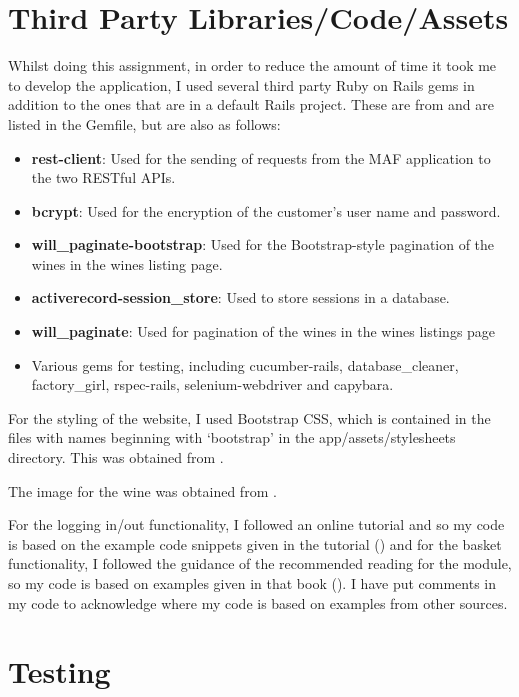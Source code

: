 \documentclass[a4paper,12pt,hidelinks]{report}
\begin{document}
\chapter{Third Party Libraries/Code/Assets}
    Whilst doing this assignment, in order to reduce the amount of time it took me to develop the application, I used several third party
    Ruby on Rails gems in addition to the ones that are in a default Rails project. These are from \cite{gems} and are listed in the Gemfile, 
    but are also as follows:
    \begin{itemize}
        \item \textbf{rest-client}: Used for the sending of requests from the MAF application to the two RESTful APIs.
        \item \textbf{bcrypt}: Used for the encryption of the customer's user name and password.
        \item \textbf{will\_paginate-bootstrap}: Used for the Bootstrap-style pagination of the wines in the wines listing page.
        \item \textbf{activerecord-session\_store}: Used to store sessions in a database.
        \item \textbf{will\_paginate}: Used for pagination of the wines in the wines listings page
        \item Various gems for testing, including cucumber-rails, database\_cleaner, factory\_girl, rspec-rails, selenium-webdriver and capybara.
    \end{itemize}

    For the styling of the website, I used Bootstrap CSS, which is contained in the files with names beginning with `bootstrap' in the app/assets/stylesheets
    directory. This was obtained from \cite{bootstrap}.

    The image for the wine was obtained from \cite{wine-image}.

    For the logging in/out functionality, I followed an online tutorial and so my code is based on the example code snippets given in the tutorial (\cite{online-ruby-book}) and
    for the basket functionality, I followed the guidance of the recommended reading for the module, so my code is based on examples given in that book (\cite{agile-web-dev}).
    I have put comments in my code to acknowledge where my code is based on examples from other sources.

\chapter{Testing}
\end{document}
